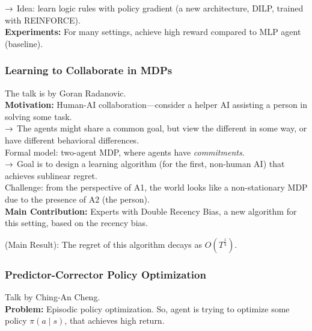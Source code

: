 $\rightarrow$ Idea: learn logic rules with policy gradient (a new architecture, DILP, trained with REINFORCE). \\

{\bf Experiments:} For many settings, achieve high reward compared to MLP agent (baseline). \\

\spacerule

\subsubsection{Learning to Collaborate in MDPs}

The talk is by Goran Radanovic. \\

{\bf Motivation:} Human-AI collaboration---consider a helper AI assisting a person in solving some task. \\

$\rightarrow$ The agents might share a common goal, but view the different in some way, or have different behavioral differences. \\

Formal model: two-agent MDP, where agents have {\it commitments}. \\

$\rightarrow$ Goal is to design a learning algorithm (for the first, non-human AI) that achieves sublinear regret. \\

Challenge: from the perspective of A1, the world looks like a non-stationary MDP due to the presence of A2 (the person). \\

{\bf Main Contribution:} Experts with Double Recency Bias, a new algorithm for this setting, based on the recency bias. 

\begin{theorem}
(Main Result): The regret of this algorithm decays as $O\left(T^{\frac{1}{4}}\right)$.
\end{theorem}

\spacerule

\subsubsection{Predictor-Corrector Policy Optimization}

Talk by Ching-An Cheng. \\

{\bf Problem:} Episodic policy optimization. So, agent is trying to optimize some policy $\pi(a \mid s)$, that achieves high return. \\

